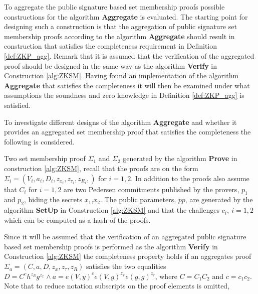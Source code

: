 
To aggregate the public signature based set membership proofs possible constructions for the algorithm \textbf{Aggregate} is evaluated. The starting point for designing such a construction is that the aggregation of public signature set membership proofs according to the algorithm \textbf{Aggregate} should result in construction that satisfies the completeness requirement in Definition \ref{def:ZKP_agg}. Remark that it is assumed that the verification of the aggregated proof should be designed in the same way as the algorithm \textbf{Verify} in Construction \ref{alg:ZKSM}. Having found an implementation of the algorithm \textbf{Aggregate} that satisfies the completeness it will then be examined under what assumptions the soundness and zero knowledge in Definition \ref{def:ZKP_agg} is satisfied. 

To investigate different designs of the algorithm \textbf{Aggregate} and whether it  provides an aggregated set membership proof that satisfies the completeness the following is considered. 

Two set membership proof $\Sigma_1$ and $\Sigma_2$ generated by the algorithm \textbf{Prove} in construction \ref{alg:ZKSM}, recall that the proofs are on the form $\Sigma_i = (V_i,a_i,D_i,z_{x_i},z_{\tau _i},z_{R_i}, )$ for $i=1,2$. In addition to the proofs also assume that $C_i$ for $i=1,2$ are two Pedersen commitments  published by the provers, $p_1$ and $p_2$, hiding the secrets $x_1$,$x_2$. The public parameters, $pp$, are generated by the algorithm \textbf{SetUp} in Construction \ref{alg:ZKSM}  and that the challenges $c_i, \:i=1,2$ which can be computed as a hash of the proofs. 

Since it will be assumed that the verification of an aggregated public signature based set membership proofs is performed as the algorithm \textbf{Verify} in Construction \ref{alg:ZKSM} the completeness property holds if an aggregates proof $\Sigma_a = (C,a,D,z_x,z_\tau,z_R)$ satisfies the two equalities  $D=C^{c}h^{z_{R}}g^{z_{x}}\wedge a = e(V,y)^ce(V,g)^{z_{x}}e(g,g)^{z_{\tau}}$, where $C=C_1C_2$ and $c=c_1c_2$.  Note that to reduce notation subscripts on the proof elements is omitted,

